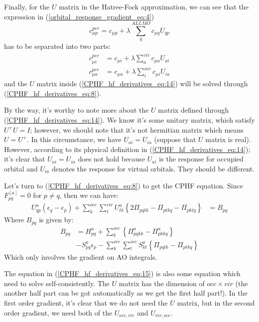 Finally, for the $U$ matrix in the Hatree-Fock approximation, we can
see that the expression in (\ref{orbital_response_gradient_eq:4})
\begin{equation}
  c^{per}_{\mu p} = c_{\mu p} + \lambda\sum_{q}^{ALL
    MO}c_{\mu q}U_{qp}
\end{equation}
has to be separated into two parts:
\begin{align}
  \label{CPHF_hf_derivatives_eq:14}
  c^{per}_{\mu i} &= c_{\mu i} + \lambda\sum_{a}^{vir}c_{\mu a}U_{ai}
  \nonumber \\
  c^{per}_{\mu a} &= c_{\mu a} + \lambda\sum_{i}^{occ}c_{\mu i}U_{ia}
\end{align}
and the $U$ matrix inside (\ref{CPHF_hf_derivatives_eq:14}) will be
solved through (\ref{CPHF_hf_derivatives_eq:8}).

By the way, it's worthy to note more about the $U$ matrix defined through
(\ref{CPHF_hf_derivatives_eq:14}). We know it's some unitary matrix, which
satisfy $U^{+}U = I$; however, we should note that it's not hermitian matrix
which means $U = U^{+}$. In this circumstance, we have $U_{ai} = U_{ia}$
(suppose that $U$ matrix is real). However, according to its physical
definition in (\ref{CPHF_hf_derivatives_eq:14}); it's clear that $U_{ai} =
U_{ia}$ does not hold because $U_{ai}$ is the response for occupied orbital and
$U_{ia}$ denotes the response for virtual orbitals. They should be different.  
 
Let's turn to (\ref{CPHF_hf_derivatives_eq:8}) to get the
CPHF equation. Since $F^{[a]}_{pq} = 0$ for $p \neq q$, then we can
have:
\begin{align}
  \label{CPHF_hf_derivatives_eq:15}
U^{a}_{qp}\left(\epsilon_{q} - \epsilon_{p}\right) + 
\sum_{k}^{occ}\sum_{t}^{vir}U^{a}_{tk}\left\{ 2\Pi_{pqtk} -
    \Pi_{ptkq} - \Pi_{pktq} \right\} &= B_{pq}
\end{align}
Where $B_{pq}$ is given by:
\begin{align}
  \label{CPHF_hf_derivatives_eq:16}
  B_{pq} &= H^{a}_{pq} + \sum_{k}^{occ}\left \{\Pi^{a}_{pqkk} - \Pi^{a}_{pkkq}
  \right\} \nonumber \\
  &-S^{a}_{pq}\epsilon_{p} - \sum_{k}^{occ}\sum_{t}^{occ}S^{a}_{kt}
  \left\{ \Pi_{pqtk} - \Pi_{ptkq} \right\} 
 \end{align}
Which only involves the gradient on AO integrals.

The equation in (\ref{CPHF_hf_derivatives_eq:15}) is also some
equation which need to solve self-consistently. The $U$ matrix has the
dimension of $occ\times vir$ (the another half part can be got automatically
as we get the first half part!). In the first order gradient, it's clear
that we do not need the $U$ matrix, but in the second order gradient, we need
both of the $U_{occ,vir}$ and $U_{vir, occ}$. 

